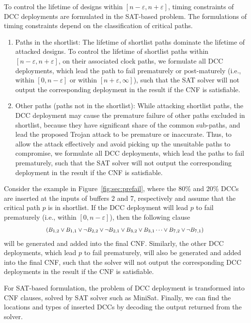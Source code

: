 To control the lifetime of designs within $[n - \varepsilon, n + \varepsilon]$, timing constraints of DCC deployments are formulated in the SAT-based problem. The formulations of timing constraints depend on the classification of critical paths.
\begin{enumerate}[leftmargin=*]
	\item Paths in the shortlist: The lifetime of shortlist paths dominate the lifetime of attacked designs. To control the lifetime of shortlist paths within $[n - \varepsilon, n + \varepsilon]$, on their associated clock paths, we formulate all DCC deployments, which lead the path to fail prematurely or post-maturely (i.e., within $[ 0, n - \varepsilon]$ or within $[ n + \varepsilon, \infty]$), such that the SAT solver will not output the corresponding deployment in the result if the CNF is satisfiable.
	\item Other paths (paths not in the shortlist): While attacking shortlist paths, the DCC deployment may cause the premature failure of other paths excluded in shortlist, because they have significant share of the common sub-paths, and lead the proposed Trojan attack to be premature or inaccurate. Thus, to allow the attack effectively and avoid picking up the unsuitable paths to compromise, we formulate all DCC deployments, which lead the paths to fail prematurely, such that the SAT solver will not output the corresponding deployment in the result if the CNF is satisfiable.  
\end{enumerate}

Consider the example in Figure~\ref{fig:sec:prefail}, where the 80\% and 20\% DCCs are inserted at the inputs of buffers 2 and 7, respectively and assume that the critical path $p$ is in shortlist. If the DCC deployment will lead $p$ to fail prematurely (i.e., within $[ 0, n - \varepsilon]$), then the following clause
\begin{gather*}
	\fontsize{8}{8} \selectfont
	\mbox{($B_{1,2} \lor B_{1,1} \lor \neg B_{2,2} \lor \neg B_{2,1}  \lor B_{3,2} \lor B_{3,1} \dots \lor B_{7,2} \lor \neg B_{7,1}$) } 
\end{gather*}
will be generated and added into the final CNF. Similarly, the other DCC deployments, which lead $p$ to fail prematurely, will also be generated and added into the final CNF, such that the solver will not output the corresponding DCC deployments in the result if the CNF is satisfiable. 

For SAT-based formulation, the problem of DCC deployment is transformed into CNF clauses, solved by SAT solver such as MiniSat. Finally, we can find the locations and types of inserted DCCs by decoding the output returned from the solver.



